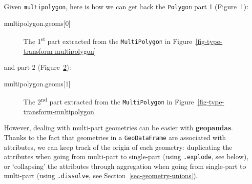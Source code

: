 \documentclass[
  letterpaper,
]{krantz}
\newenvironment{Shaded}{\begin{snugshade}}{\end{snugshade}}
\newcommand{\DecValTok}[1]{\textcolor[rgb]{0.68,0.00,0.00}{#1}}
\newcommand{\NormalTok}[1]{\textcolor[rgb]{0.00,0.23,0.31}{#1}}
\begin{document}
Given \texttt{multipolygon}, here is how we can get back the
\texttt{\textquotesingle{}Polygon\textquotesingle{}} part 1
(Figure~\ref{fig-type-transform-multipolygon1}):

\begin{Shaded}
\begin{Highlighting}[]
\NormalTok{multipolygon.geoms[}\DecValTok{0}\NormalTok{]}
\end{Highlighting}
\end{Shaded}

\begin{figure}[H]


\caption{\label{fig-type-transform-multipolygon1}The
1\textsuperscript{st} part extracted from the
\texttt{\textquotesingle{}MultiPolygon\textquotesingle{}} in
Figure~\ref{fig-type-transform-multipolygon}}

\end{figure}%

and part 2 (Figure~\ref{fig-type-transform-multipolygon2}):

\begin{Shaded}
\begin{Highlighting}[]
\NormalTok{multipolygon.geoms[}\DecValTok{1}\NormalTok{]}
\end{Highlighting}
\end{Shaded}

\begin{figure}[H]


\caption{\label{fig-type-transform-multipolygon2}The
2\textsuperscript{nd} part extracted from the
\texttt{\textquotesingle{}MultiPolygon\textquotesingle{}} in
Figure~\ref{fig-type-transform-multipolygon}}

\end{figure}%

However, dealing with multi-part geometries can be easier with
\textbf{geopandas}. Thanks to the fact that geometries in a
\texttt{GeoDataFrame} are associated with attributes, we can keep track
of the origin of each geometry: duplicating the attributes when going
from multi-part to single-part (using \texttt{.explode}, see below), or
`collapsing' the attributes through aggregation when going from
single-part to multi-part (using \texttt{.dissolve}, see
Section~\ref{sec-geometry-unions}).
\end{document}
